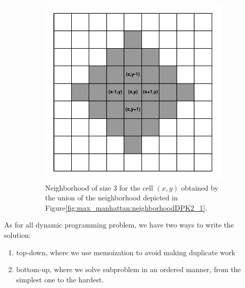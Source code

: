 \begin{figure}
    \begin{subfigure}[t]{0.4\textwidth}
        \centering
        \includegraphics[width=\textwidth]{sources/max_manhattan/images/neighborhoodDPK2_2}
        \caption[]{Neighborhood of size $3$ for the cell $(x,y)$ obtained by the union of the
        neighborhood depicted in Figure\ref{fig:max_manhattan:neighborhoodDPK2_1}.}
        \label{fig:max_manhattan:neighborhoodDPK2_2}
     \end{subfigure}
     \label{}
     \caption{}
\end{figure}


As for all dynamic programming problem, we have two ways to write the solution:
\begin{enumerate}
    \item top-down, where we use memoization to avoid making duplicate work
    \item bottom-up, where we solve subproblem in an ordered manner, from the simplest one to the
    hardest.
\end{enumerate}

